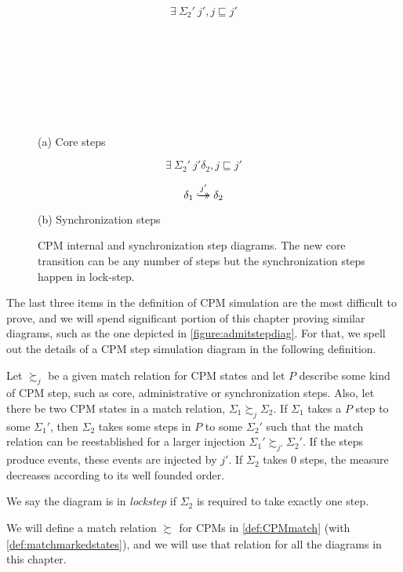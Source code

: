 \begin{figure}\centering
 \begin{multicols}{2}

$$\exists\ \Sigma_2'\ j', j \sqsubseteq j' $$

\

\

\

\

(a) Core steps

\columnbreak

$$\exists\ \Sigma_2'\ j' \delta_2, j \sqsubseteq j' $$
$$\delta_1 \overset{j'}{\hookrightarrow\mathrel{\mspace{-15mu}}\rightarrow} \delta_2$$

(b) Synchronization steps 
\end{multicols}
\caption[CPM step diagrams]{CPM internal and synchronization step diagrams. The new core transition can be any number of steps but the synchronization steps happen in lock-step.}\label{figure:cpmstepdiag}
\end{figure}

The last three items in the definition of CPM simulation are the most difficult to prove, and we will spend significant portion of this chapter proving similar diagrams, such as the one depicted in \cref{figure:admitstepdiag}. For that, we spell out the details of a CPM step simulation diagram in the following definition. 

\begin{definition}
Let $\succsim_{j}$ be a given match relation for CPM states and let $P$ describe some kind of CPM step, such as core, administrative or synchronization steps. Also, let there be two CPM states in a match relation, $\Sigma_1 \succsim_j \Sigma_2$. If $\Sigma_1$ takes a $P$ step to some $\Sigma_1'$, then $\Sigma_2$ takes some steps in $P$ to some $\Sigma_2'$ such that the match relation can be reestablished for a larger injection $\Sigma_1' \succsim_{j'} \Sigma_2'$.%
If the steps produce events, these events are injected by $j'$. If $\Sigma_2$ takes 0 steps, the measure decreases according to its well founded order.

We say the diagram is in \emph{lockstep} if $\Sigma_2$ is required to take exactly one step.
\end{definition}
We will define a match relation $\succsim_{}$ for CPMs in \cref{def:CPMmatch} (with \cref{def:matchmarkedstates}), and we will use that relation for all the diagrams in this chapter.

